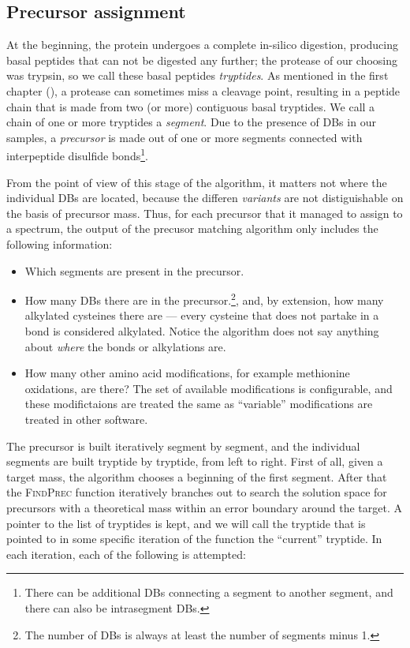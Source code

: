 \subsection{Precursor assignment}

At the beginning, the protein undergoes a complete in-silico digestion, producing basal peptides that can not be digested any further; the protease of our choosing was trypsin, so we call these basal peptides \emph{tryptides}. As mentioned in the first chapter (), a protease can sometimes miss a cleavage point, resulting in a peptide chain that is made from two (or more) contiguous basal tryptides. We call a chain of one or more tryptides a \emph{segment}. Due to the presence of DBs in our samples, a \emph{precursor} is made out of one or more segments connected with interpeptide disulfide bonds\footnote{There can be additional DBs connecting a segment to another segment, and there can also be intrasegment DBs.}.


From the point of view of this stage of the algorithm, it matters not where the individual DBs are located, because the differen \emph{variants} are not distiguishable on the basis of precursor mass. Thus, for each precursor that it managed to assign to a spectrum, the output of the precusor matching algorithm only includes the following information:

\begin{itemize}
	\item  Which segments are present in the precursor.
	\item How many DBs there are in the precursor.\footnote{The number of DBs is always at least the number of segments minus 1.}, and, by extension, how many alkylated cysteines there are --- every cysteine that does not partake in a bond is considered alkylated. Notice the algorithm does not say anything about \emph{where} the bonds or alkylations are.
	\item How many other amino acid modifications, for example methionine oxidations, are there? The set of available modifications is configurable, and these modifictaions are treated the same as ``variable'' modifications are treated in other software.
\end{itemize}


The precursor is built iteratively segment by segment, and the individual segments are built tryptide by tryptide, from left to right. First of all, given a target mass, the algorithm chooses a beginning of the first segment. After that the \textsc{FindPrec} function iteratively branches out to search the solution space for precursors with a theoretical mass within an error boundary around the target. A pointer to the list of tryptides is kept, and we will call the tryptide that is pointed to in some specific iteration of the function the ``current'' tryptide. In each iteration, each of the following is attempted:

